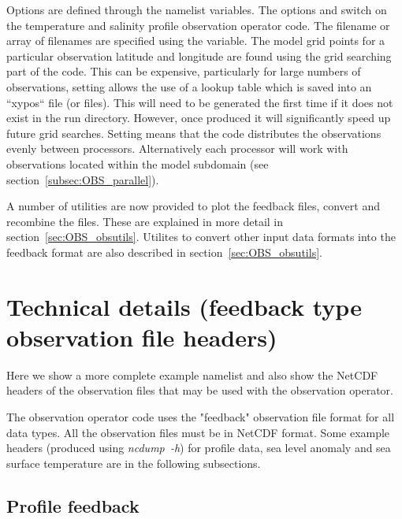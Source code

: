 \documentclass[../tex_main/NEMO_manual]{subfiles}
\begin{document}
Options are defined through the  namelist variables.
The options  and  switch on the temperature and salinity profile observation operator code.
The filename or array of filenames are specified using the  variable.
The model grid points for a particular observation latitude and longitude are found using
the grid searching part of the code.
This can be expensive, particularly for large numbers of observations,
setting  allows the use of a lookup table which
is saved into an ``xypos`` file (or files).
This will need to be generated the first time if it does not exist in the run directory.
However, once produced it will significantly speed up future grid searches.
Setting  means that the code distributes the observations evenly between processors.
Alternatively each processor will work with observations located within the model subdomain
(see section~\autoref{subsec:OBS_parallel}).

A number of utilities are now provided to plot the feedback files, convert and recombine the files.
These are explained in more detail in section~\autoref{sec:OBS_obsutils}.
Utilites to convert other input data formats into the feedback format are also described in
section~\autoref{sec:OBS_obsutils}.

\section{Technical details (feedback type observation file headers)}
\label{sec:OBS_details}

Here we show a more complete example namelist  and also show the NetCDF headers of
the observation files that may be used with the observation operator.



The observation operator code uses the "feedback" observation file format for all data types.
All the observation files must be in NetCDF format.
Some example headers (produced using \mbox{\textit{ncdump~-h}}) for profile data, sea level anomaly and
sea surface temperature are in the following subsections.

\subsection{Profile feedback}
\end{document}
